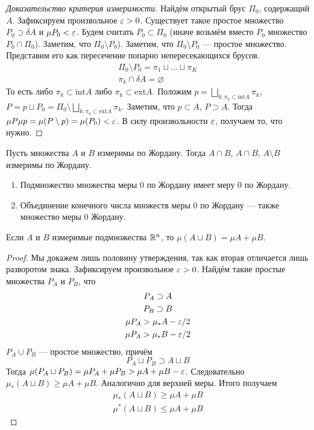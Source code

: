 \begin{proof}[Доказательство критерия измеримости]
Найдём открытый брус $\Pi_0$, содержащий $A$. Зафиксируем произвольное $\varepsilon >0$. Существует такое простое множество $P_0\supset \delta A$ и $\mu P_0 < \varepsilon$. Будем считать $P_0 \subset \Pi_0$ (иначе возьмём вместо $P_0$ множество $P_0\cap \Pi_0$). Заметим, что $\Pi_0 \setminus P_0$). Заметим, что $\Pi_0 \setminus P_0$ --- простое множество. Представим его как пересечение попарно непересекающихся брусов.
\begin{gather}
    \Pi_0 \setminus P_0 = \pi_1 \sqcup \ldots \sqcup \pi_K\\
    \pi_k \cap \delta A = \varnothing
\end{gather}
То есть либо $\pi_k \subset \mathrm{int}A$ либо $\pi_k \subset \mathrm{ext}A$. Положим $p = \bigsqcup\limits_{k\colon \pi_k \subset \mathrm{int}A} \pi_k$, $P = p \sqcup P_0 = \Pi_0 \setminus \bigsqcup\limits_{k\colon \pi_k \subset \mathrm{ext}A}\pi_k$.
Заметим, что $p \subset A$, $P\supset A$. Тогда $\mu P \mu p = \mu(P \setminus p) = \mu(P_0) < \varepsilon$. В силу произвольности $\varepsilon$, получаем то, что нужно.
\end{proof}
\begin{Consequence}
Пусть множества $A$ и $B$ измеримы по Жордану. Тогда $A \cap B$, $A \cap B$, $A \setminus B$ измеримы по Жордану.
\end{Consequence}
\begin{Comment}
\begin{enumerate}
    \item Подмножество множества меры 0 по Жордану имеет меру 0 по Жордану.
    \item Объединение конечного числа множеств меры 0 по Жордану --- также множество меры 0 Жордану.
\end{enumerate}
\end{Comment}
\begin{Statement}
Если $A$ и $B$ измеримые подмножества $\mathbb{R}^n$, то $\mu(A \sqcup B) = \mu A + \mu B$.
\end{Statement}
\begin{proof}
Мы докажем лишь половину утверждения, так как вторая отличается лишь разворотом знака. Зафиксируем произвольное $\varepsilon > 0$. Найдём такие простые множества $P_A$ и $P_B$, что
\begin{gather}
    P_A \supset A\\
    P_B \supset B\\
    \mu P_A > \mu_*A - \varepsilon/2\\
    \mu P_A > \mu_*B - \varepsilon/2
\end{gather}
$P_A \cup P_B$ --- простое множество, причём
$$
    P_A \sqcup P_B \supset A \sqcup B
$$
Тогда $\mu(P_A \sqcup P_B) = \mu P_A + \mu P_B > \mu A + \mu B - \varepsilon$. Следовательно $\mu_*(A \sqcup B)\geqslant \mu A + \mu B$. Аналогично для верхней меры. Итого получаем
\begin{gather}
    \mu_*(A \sqcup B)\geqslant \mu A + \mu B\\
    \mu^*(A \sqcup B)\leqslant \mu A + \mu B
\end{gather}
\end{proof}
